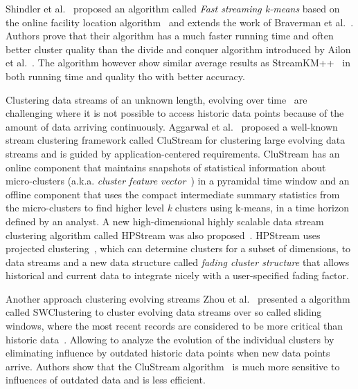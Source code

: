 Shindler et al.~\citep{Shindler:2011} proposed an algorithm called \textit{Fast streaming k-means} based on the online facility location algorithm~\citep{Meyerson:2001} and extends the work of Braverman et al.~\citep{Braverman:2011}. Authors prove that their algorithm has a much faster running time and often better cluster quality than the divide and conquer algorithm introduced by Ailon et al.~\citep{Ailon:2009}. The algorithm however show similar average results as StreamKM++~\citep{Ackermann:2010} in both running time and quality tho with better accuracy.

Clustering data streams of an unknown length, evolving over time~\citep{Aggarwal:2002, Aggarwal:2003Evolving} are challenging where it is not possible to access historic data points because of the amount of data arriving continuously. Aggarwal et al.~\citep{Aggarwal:2003} proposed a well-known stream clustering framework called CluStream for clustering large evolving data streams and is guided by application-centered requirements. CluStream has an online component that maintains snapshots of statistical information about micro-clusters (a.k.a. \textit{cluster feature vector}~\citep{Zhang:1996}) in a pyramidal time window and an offline component that uses the compact intermediate summary statistics from the micro-clusters to find higher level \textit{k} clusters using k-means, in a time horizon defined by an analyst. A new high-dimensional highly scalable data stream clustering algorithm called HPStream was also proposed~\citep{Aggarwal:2004}. HPStream uses projected clustering~\citep{Aggarwal:1999}, which can determine clusters for a subset of dimensions, to data streams and a new data structure called \textit{fading cluster structure} that allows historical and current data to integrate nicely with a user-specified fading factor. 

Another approach clustering evolving streams Zhou et al.~\citep{Zhou:2008} presented a algorithm called SWClustering to cluster evolving data streams over so called sliding windows, where the most recent records are considered to be more critical than historic data~\citep{Datar:2002SW}. Allowing to analyze the evolution of the individual clusters by eliminating influence by outdated historic data points when new data points arrive. Authors show that the CluStream algorithm~\citep{Aggarwal:2003} is much more sensitive to influences of outdated data and is less efficient.

